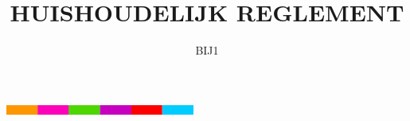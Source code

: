 \documentclass{article}
\title{HUISHOUDELIJK REGLEMENT}
\author{BIJ1}
\date{}
\begin{document}
\maketitle


\includegraphics[width=\textwidth,height=0.3cm]{stripes.png}
\end{document}
